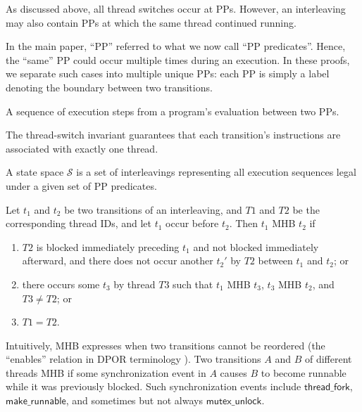 As discussed above, all thread switches occur at PPs.
However, an interleaving may also contain PPs at which the same thread continued running.

In the main paper, ``PP'' referred to what we now call ``PP predicates''.
Hence, the ``same'' PP could occur multiple times during an execution.
In these proofs, we separate such cases into multiple unique PPs:
each PP is simply a label denoting the boundary between two transitions.

\begin{definition}[Transition]
A sequence of execution steps from a program's evaluation between two PPs.
\label{def:transition}

\end{definition}
The thread-switch invariant guarantees that each transition's instructions are associated with exactly one thread.

\begin{definition}
	A state space $\mathcal{S}$ is a set of interleavings representing all execution sequences legal under a given set of PP predicates.
\end{definition}

\begin{definition}[Must-happen-before (MHB)]
Let $t_1$ and $t_2$ be two transitions of an interleaving, and $T1$ and $T2$ be the corresponding thread IDs,
and let $t_1$ occur before $t_2$.
Then $t_1$ MHB $t_2$ if
\begin{enumerate}
	\item $T2$ is blocked immediately preceding $t_1$ and not blocked immediately afterward,
		and there does not occur another $t_2'$ by $T2$ between $t_1$ and $t_2$; or
	\item there occurs some $t_3$ by thread $T3$ such that $t_1$ MHB $t_3$, $t_3$ MHB $t_2$, and $T3 \ne T2$; or
	\item $T1 = T2$.
\end{enumerate}
\end{definition}

Intuitively, MHB expresses when two transitions cannot be reordered
(the ``enables'' relation in DPOR terminology \cite{dpor}).
Two transitions $A$ and $B$ of different threads MHB if some synchronization event in $A$ causes $B$ to become runnable while it was previously blocked.
Such synchronization events include $\mathsf{thread\_fork}$, $\mathsf{make\_runnable}$,
and sometimes but not always $\mathsf{mutex\_unlock}$.

